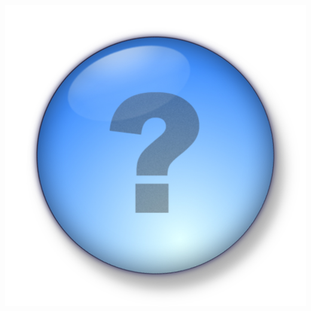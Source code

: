 \documentclass[colorlinks]{beamer}
\begin{document}
\begin{frame} 
  \begin{center}
    \centering \includegraphics[width=0.5\linewidth]{figs/question_mark}
  \end{center}
\end{frame}
\end{document}

